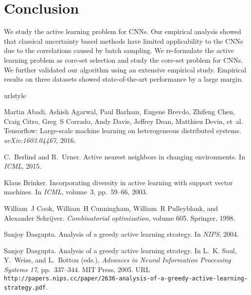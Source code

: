 \documentclass{article} \usepackage{iclr2018_conference,times}
\begin{document}
\section{Conclusion} We study the active learning problem for CNNs. Our empirical analysis showed that classical
uncertainty based methods have limited applicability to the CNNs due to the correlations caused by batch sampling. We
re-formulate the active learning problem as core-set selection and study the core-set problem for CNNs. We further
validated our algorithm using an extensive empirical study. Empirical results on three datasets showed state-of-the-art
performance by a large margin.


\begin{thebibliography}{51}
\providecommand{\natexlab}[1]{#1}
\providecommand{\url}[1]{\texttt{#1}}
\expandafter\ifx\csname urlstyle\endcsname\relax
  \providecommand{\doi}[1]{doi: #1}\else
  \providecommand{\doi}{doi: \begingroup \urlstyle{rm}\Url}\fi

Martin Abadi, Ashish Agarwal, Paul Barham, Eugene Brevdo, Zhifeng Chen, Craig
  Citro, Greg~S Corrado, Andy Davis, Jeffrey Dean, Matthieu Devin, et~al.
\newblock Tensorflow: Large-scale machine learning on heterogeneous distributed
  systems.
\newblock \emph{arXiv:1603.04467}, 2016.

C.~Berlind and R.~Urner.
\newblock Active nearest neighbors in changing environments.
\newblock In \emph{ICML}, 2015.

Klaus Brinker.
\newblock Incorporating diversity in active learning with support vector
  machines.
\newblock In \emph{ICML}, volume~3, pp.\  59--66, 2003.

William~J Cook, William~H Cunningham, William~R Pulleyblank, and Alexander
  Schrijver.
\newblock \emph{Combinatorial optimization}, volume 605.
\newblock Springer, 1998.

Sanjoy Dasgupta.
\newblock Analysis of a greedy active learning strategy.
\newblock In \emph{NIPS}, 2004.

Sanjoy Dasgupta.
\newblock Analysis of a greedy active learning strategy.
\newblock In L.~K. Saul, Y.~Weiss, and L.~Bottou (eds.), \emph{Advances in
  Neural Information Processing Systems 17}, pp.\  337--344. MIT Press, 2005.
\newblock URL
  \url{http://papers.nips.cc/paper/2636-analysis-of-a-greedy-active-learning-strategy.pdf}.


\end{thebibliography}
\end{document}
